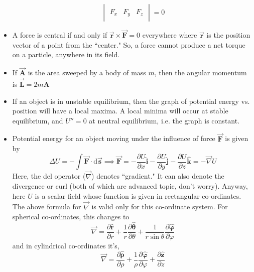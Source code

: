 \documentclass{scrartcl}
\begin{document}
\begin{itemize}
\[\begin{vmatrix}
            \\F_x & F_y & F_z \\
        \end{vmatrix}=0\]
        \item A force is central if and only if $\vec{\mathbf r}\times\vec{\mathbf F}=0$ everywhere where $\vec{\mathbf r}$ is the position vector of a point from the ``center." So, a force cannot produce a net torque on a particle, anywhere in its field.
        \item If $\vec{{\mathbf A}}$ is the area sweeped by a body of mass $m$, then the angular momentum is $\vec{\mathbf L}=2m\dot{\mathbf A}$
        \item If an object is in unstable equilibrium, then the graph of potential energy vs. position will have a local maxima. A local minima will occur at stable equilibrium, and $U''=0$ at neutral equilibrium, i.e. the graph is constant.
        \item Potential energy for an object moving under the influence of  force $\vec{\mathbf F}$ is given by \[\Delta U=-\int \vec{\mathbf F}\cdot\mathrm d\vec{\mathbf s}\implies\vec{\mathbf F}=-\frac{\partial U}{\partial x}\mathbf{\hat i}-\frac{\partial U}{\partial y}\mathbf{\hat j}-\frac{\partial U}{\partial z}\mathbf{\hat k}=-\vec\nabla U\] Here, the del operator ($\vec\nabla$) denotes ``gradient." It can also denote the divergence or curl (both of which are advanced topic, don't worry). Anyway, here $U$ is a scalar field whose function is given in rectangular co-ordinates. The above formula for $\vec\nabla$ is valid only for this co-ordinate system. For spherical co-ordinates, this changes to \[\vec\nabla=\frac{\partial\hat{\mathbf r}}{\partial r}+\frac1r\frac{\partial\hat{\mathbf{\theta}}}{\partial \theta}+\frac1{r\sin\theta}\frac{\partial\hat{\mathbf{\varphi}}}{\partial\varphi}\] and in cylindrical co-ordinates it's, \[\vec\nabla=\frac{\partial\hat{\mathbf{\rho}}}{\partial\rho}+\frac1\rho\frac{\partial\hat{\mathbf{\varphi}}}{\partial\varphi}+\frac{\partial\hat{\mathbf z}}{\partial z}\]
        \begin{figure}[H]
            \centering
            \begin{minipage}[b]{0.4\textwidth}

\end{minipage}
\end{figure}
\end{itemize}
\end{document}
